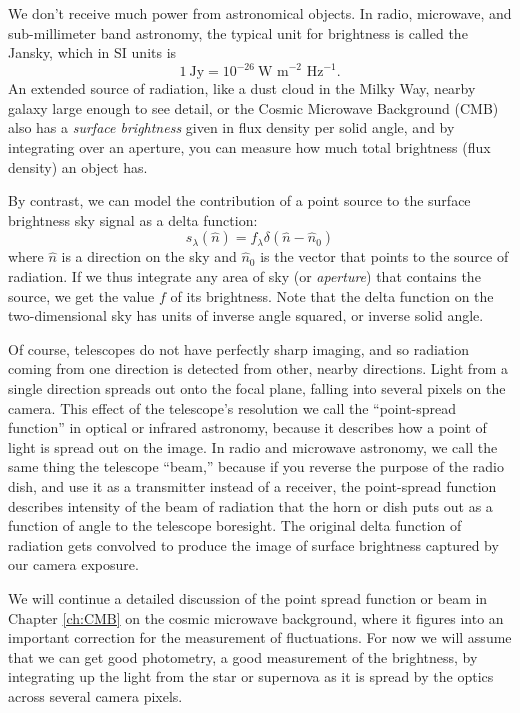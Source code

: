 We don't receive much power from astronomical objects.  In radio, microwave, and sub-millimeter band astronomy, the typical unit for brightness is called the Jansky, which in SI units is
\begin{equation}
  1\ \mbox{Jy} = 10^{-26}\ \mbox{W m}^{-2}\mbox{ Hz}^{-1}.
\end{equation}
An extended source of radiation, like a dust cloud in the Milky Way, nearby galaxy large enough to see detail, or the Cosmic Microwave Background (CMB) also has a \textit{surface brightness} given in flux density per solid angle, and by integrating over an aperture, you can measure how much total brightness (flux density) an object has.

By contrast, we can model the contribution of a point source to the surface brightness sky signal as a delta function:
\begin{equation}
  s_\lambda(\hat n) = f_\lambda \delta( \hat n - \hat n_0)
\end{equation}
where $\hat n$ is a direction on the sky and $\hat n_0$ is the vector that points to the source of radiation.  If we thus integrate any area of sky (or \textit{aperture}) that contains the source, we get the value $f$ of its brightness. Note that the delta function  on the two-dimensional sky has units of inverse angle squared, or inverse solid angle. 

Of course, telescopes do not have perfectly sharp imaging, and so radiation coming from one direction is detected from other, nearby directions.   Light from a single direction spreads out onto the focal plane, falling into several pixels on the camera.  This effect of the telescope's resolution we call the ``point-spread function'' in optical or infrared astronomy, because it describes how a point of light is spread out on the image. In radio and microwave astronomy, we call the same thing the telescope ``beam,'' because if you reverse the purpose of the radio dish, and use it as a transmitter instead of a receiver, the point-spread function describes intensity of the beam of radiation that the horn or dish puts out as a function of angle to the telescope boresight.  The original delta function of radiation gets convolved to produce the image of surface brightness captured by our camera exposure.

We will continue a detailed discussion of the point spread function or beam in Chapter \ref{ch:CMB} on the cosmic microwave background, where it figures into an important correction for the measurement of fluctuations.  For now we will assume that we can get good photometry, a good measurement of the brightness, by integrating up the light from the star or supernova as it is spread by the optics across several camera pixels.

